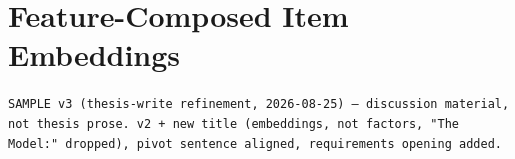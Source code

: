 \documentclass[11pt,a4paper]{article}
\begin{document}
\section*{Feature-Composed Item Embeddings}
{\scriptsize\color{gray}\texttt{SAMPLE v3 (thesis-write refinement, 2026-08-25) — discussion material, not thesis prose. v2 + new title (embeddings, not factors, "The Model:" dropped), pivot sentence aligned, requirements opening added.}\par}
\vspace{1em}


\end{document}
